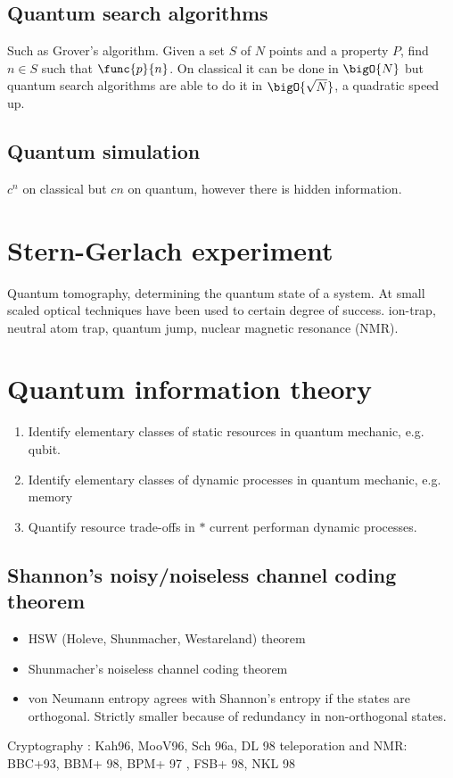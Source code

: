 \subsection{Quantum search algorithms}
Such as Grover's algorithm.
Given a set \(S\) of \(N\) points and a property \(P\), find \(n \in S\) such that \(\func{p}{n}\). On classical it can be done in \(\bigO{N}\) but quantum search algorithms are able to do it in \(\bigO{\sqrt{N}}\), a quadratic speed up.
\subsection{Quantum simulation}
\(c^n\) on classical but \(cn\) on quantum, however there is hidden information.
\section{Stern-Gerlach experiment}
Quantum tomography, determining the quantum state of a system.
At small scaled optical techniques have been used to certain degree of success. ion-trap, neutral atom trap, quantum jump, nuclear magnetic resonance (NMR).

\section{Quantum information theory}
\begin{enumerate}
    \item Identify elementary classes of static resources in quantum mechanic, e.g. qubit.
    \item Identify elementary classes of dynamic processes in quantum mechanic, e.g. memory
    \item Quantify resource trade-offs in \(\ast\) current performan dynamic processes.
\end{enumerate}
\subsection{Shannon's noisy/noiseless channel coding theorem}
\begin{itemize}
    \item HSW (Holeve, Shunmacher, Westareland) theorem
    \item Shunmacher's noiseless channel coding theorem
    \item von Neumann entropy agrees with Shannon's entropy if the states are orthogonal. Strictly smaller because of redundancy in non-orthogonal states.
\end{itemize}


Cryptography : Kah96, MooV96, Sch 96a, DL 98 
teleporation and NMR: BBC+93, BBM+ 98, BPM+ 97 , FSB+ 98, NKL 98